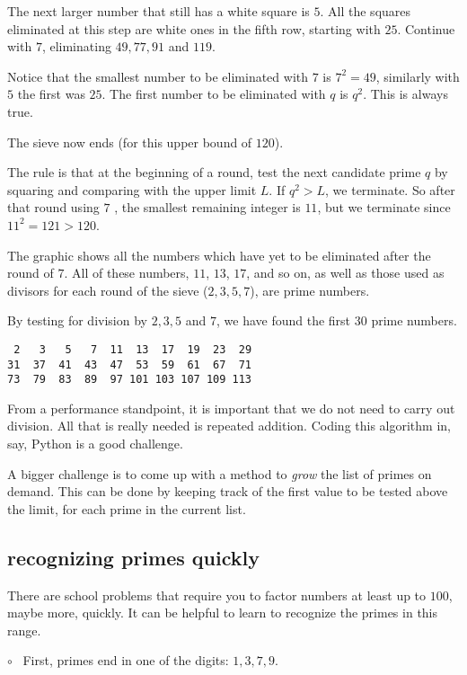\documentclass[11pt, oneside]{article}
\begin{document}
The next larger number that still has a white square is $5$.  All the squares eliminated at this step are white ones in the fifth row, starting with $25$.  Continue with $7$, eliminating $49, 77, 91$ and $119$.

Notice that the smallest number to be eliminated with $7$ is $7^2 = 49$, similarly with $5$ the first was $25$.  The first number to be eliminated with $q$ is $q^2$.  This is always true.

The sieve now ends (for this upper bound of $120$).

The rule is that at the beginning of a round, test the next candidate prime $q$ by squaring and comparing with the upper limit $L$.  If $q^2 > L$,  we terminate.  So after that round using $7$ , the smallest remaining integer is $11$, but we terminate since $11^2 = 121 > 120$.

The graphic shows all the numbers which have yet to be eliminated after the round of $7$.   All of these numbers, $11$, $13$, $17$, and so on, as well as those used as divisors for each round of the sieve ($2, 3, 5, 7$), are prime numbers.

By testing for division by $2, 3, 5$ and $7$, we have found the first $30$ prime numbers.

\begin{verbatim}
 2   3   5   7  11  13  17  19  23  29
31  37  41  43  47  53  59  61  67  71 
73  79  83  89  97 101 103 107 109 113
\end{verbatim}

From a performance standpoint, it is important that we do not need to carry out division.  All that is really needed is repeated addition.  Coding this algorithm in, say, Python is a good challenge.  

A bigger challenge is to come up with a method to \emph{grow} the list of primes on demand.  This can be done by keeping track of the first value to be tested above the limit, for each prime in the current list.

\subsection*{recognizing primes quickly}

There are school problems that require you to factor numbers at least up to $100$, maybe more, quickly.  It can be helpful to learn to recognize the primes in this range.

$\circ$ \ First, primes end in one of the digits: $1,3,7,9$.
\end{document}
